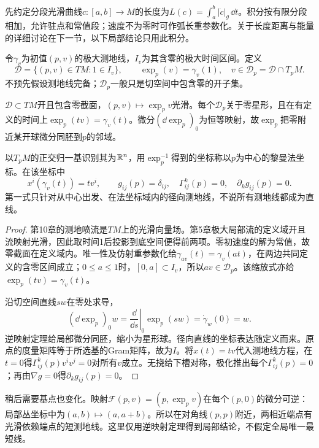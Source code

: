 先约定分段光滑曲线$c:[a,b]\to M$的长度为$L(c)=\int_a^b|\dot c|_g\,\dd t$。积分按有限分段相加，允许驻点和常值段；速度不为零时可作弧长重参数化。关于长度距离与能量的详细讨论在下一节，以下局部结论只用此积分。

\begin{definition}[指数映射的自然定义域]\label{def:exponential-domain}
令$\gamma_v$为初值$(p,v)$的极大测地线，$I_v$为其含零的极大时间区间。定义
\[
 \mathcal D=\{(p,v)\in TM:1\in I_v\},\qquad
 \exp_p(v)=\gamma_v(1),\quad v\in\mathcal D_p=\mathcal D\cap T_pM.
\]
不预先假设测地线完备；$\mathcal D_p$一般只是切空间中包含零的开子集。
\end{definition}

\begin{theorem}[指数映射与法坐标]\label{thm:normal-coordinates}
$\mathcal D\subset TM$开且包含零截面，$(p,v)\mapsto\exp_pv$光滑。每个$\mathcal D_p$关于零星形，且在有定义的时间上$\exp_p(tv)=\gamma_v(t)$。微分$(\dd\exp_p)_0$为恒等映射，故$\exp_p$把零附近某开球微分同胚到$p$的邻域。

以$T_pM$的正交归一基识别其为$\mathbb{R}^n$，用$\exp_p^{-1}$得到的坐标称以$p$为中心的黎曼法坐标。在该坐标中
\[
 x^i(\gamma_v(t))=tv^i,\qquad
 g_{ij}(p)=\delta_{ij},\quad \Gamma^k_{ij}(p)=0,\quad \partial_k g_{ij}(p)=0.
\]
第一式只针对从中心出发、在法坐标域内的径向测地线，不说所有测地线都成为直线。
\end{theorem}
\begin{proof}
第10章的测地喷流是$TM$上的光滑向量场。第5章极大局部流的定义域开且流映射光滑，因此取时间1后投影到底空间便得前两项。零初速度的解为常值，故零截面在定义域内。唯一性及仿射重参数化给$\gamma_{av}(t)=\gamma_v(at)$，在两边共同定义的含零区间成立；$0\leq a\leq1$时，$[0,a]\subset I_v$，所以$av\in\mathcal D_p$。该缩放式亦给$\exp_p(tv)=\gamma_v(t)$。

沿切空间直线$sw$在零处求导，
\[
 (\dd\exp_p)_0w=\left.\frac{\dd}{\dd s}\right|_0\exp_p(sw)
 =\dot\gamma_w(0)=w.
\]
逆映射定理给局部微分同胚，缩小为星形球。径向直线的坐标表达随定义而来。原点的度量矩阵等于所选基的Gram矩阵，故为$I$。将$x(t)=tv$代入测地线方程，在$t=0$得$\Gamma^k_{ij}(p)v^iv^j=0$对所有$v$成立。无挠给下槽对称，极化推出每个$\Gamma^k_{ij}(p)=0$；再由$\nabla g=0$得$\partial_k g_{ij}(p)=0$。
\end{proof}

稍后需要基点也变化。映射$\mathcal F(p,v)=(p,\exp_pv)$在每个$(p,0)$的微分可逆：局部丛坐标中为$(a,b)\mapsto(a,a+b)$。所以在对角线$(p,p)$附近，两相近端点有光滑依赖端点的短测地线。这里仅用逆映射定理得到局部结论，不假定全局唯一最短线。

